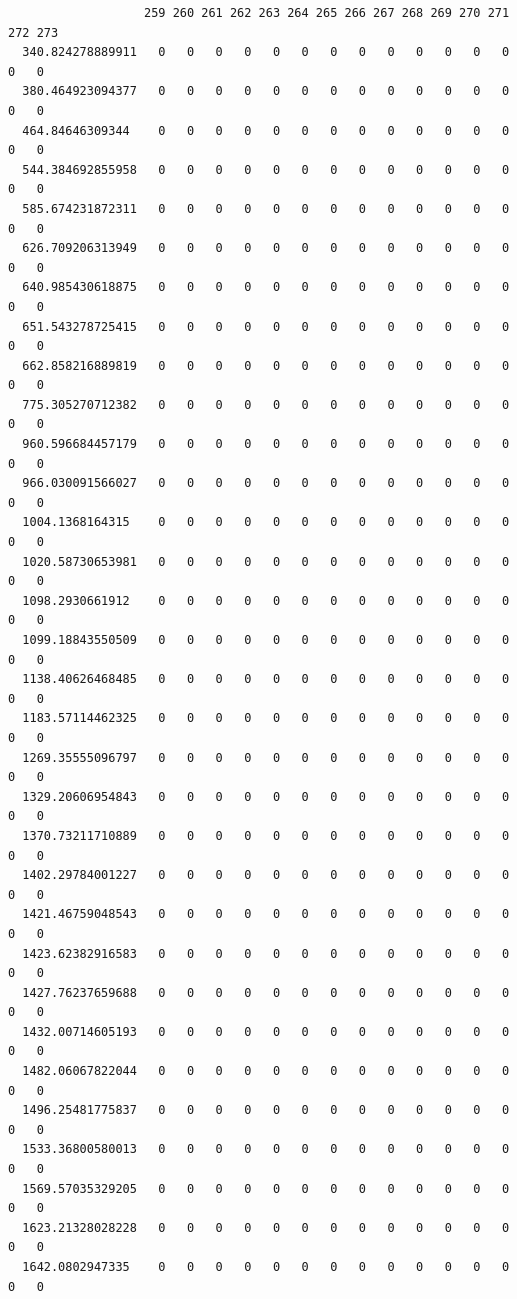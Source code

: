 \documentclass[
  letterpaper,
  DIV=11,
  numbers=noendperiod]{scrartcl}
\begin{document}
\begin{verbatim}
                   259 260 261 262 263 264 265 266 267 268 269 270 271 272 273
  340.824278889911   0   0   0   0   0   0   0   0   0   0   0   0   0   0   0
  380.464923094377   0   0   0   0   0   0   0   0   0   0   0   0   0   0   0
  464.84646309344    0   0   0   0   0   0   0   0   0   0   0   0   0   0   0
  544.384692855958   0   0   0   0   0   0   0   0   0   0   0   0   0   0   0
  585.674231872311   0   0   0   0   0   0   0   0   0   0   0   0   0   0   0
  626.709206313949   0   0   0   0   0   0   0   0   0   0   0   0   0   0   0
  640.985430618875   0   0   0   0   0   0   0   0   0   0   0   0   0   0   0
  651.543278725415   0   0   0   0   0   0   0   0   0   0   0   0   0   0   0
  662.858216889819   0   0   0   0   0   0   0   0   0   0   0   0   0   0   0
  775.305270712382   0   0   0   0   0   0   0   0   0   0   0   0   0   0   0
  960.596684457179   0   0   0   0   0   0   0   0   0   0   0   0   0   0   0
  966.030091566027   0   0   0   0   0   0   0   0   0   0   0   0   0   0   0
  1004.1368164315    0   0   0   0   0   0   0   0   0   0   0   0   0   0   0
  1020.58730653981   0   0   0   0   0   0   0   0   0   0   0   0   0   0   0
  1098.2930661912    0   0   0   0   0   0   0   0   0   0   0   0   0   0   0
  1099.18843550509   0   0   0   0   0   0   0   0   0   0   0   0   0   0   0
  1138.40626468485   0   0   0   0   0   0   0   0   0   0   0   0   0   0   0
  1183.57114462325   0   0   0   0   0   0   0   0   0   0   0   0   0   0   0
  1269.35555096797   0   0   0   0   0   0   0   0   0   0   0   0   0   0   0
  1329.20606954843   0   0   0   0   0   0   0   0   0   0   0   0   0   0   0
  1370.73211710889   0   0   0   0   0   0   0   0   0   0   0   0   0   0   0
  1402.29784001227   0   0   0   0   0   0   0   0   0   0   0   0   0   0   0
  1421.46759048543   0   0   0   0   0   0   0   0   0   0   0   0   0   0   0
  1423.62382916583   0   0   0   0   0   0   0   0   0   0   0   0   0   0   0
  1427.76237659688   0   0   0   0   0   0   0   0   0   0   0   0   0   0   0
  1432.00714605193   0   0   0   0   0   0   0   0   0   0   0   0   0   0   0
  1482.06067822044   0   0   0   0   0   0   0   0   0   0   0   0   0   0   0
  1496.25481775837   0   0   0   0   0   0   0   0   0   0   0   0   0   0   0
  1533.36800580013   0   0   0   0   0   0   0   0   0   0   0   0   0   0   0
  1569.57035329205   0   0   0   0   0   0   0   0   0   0   0   0   0   0   0
  1623.21328028228   0   0   0   0   0   0   0   0   0   0   0   0   0   0   0
  1642.0802947335    0   0   0   0   0   0   0   0   0   0   0   0   0   0   0

\end{verbatim}
\end{document}
